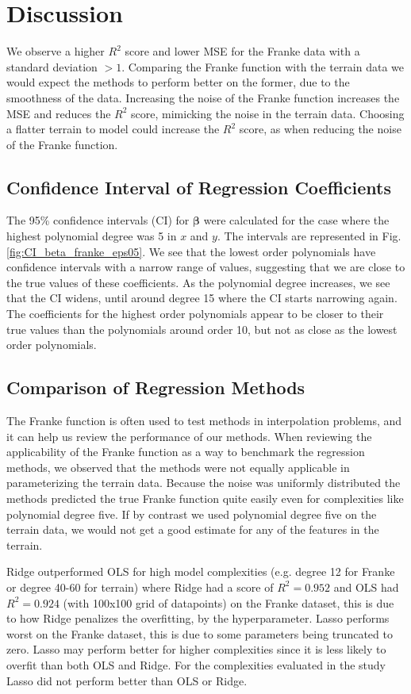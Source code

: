 \documentclass[%
 reprint,
nofootinbib,
 amsmath,amssymb,
 aps,
]{revtex4-2}
\begin{document}
\section{Discussion}\label{sec:discussion}
We observe a higher $R^2$ score and lower MSE for the Franke data with a standard deviation $> 1$. Comparing the Franke function with the terrain data we would expect the methods to perform better on the former, due to the smoothness of the data. Increasing the noise of the Franke function increases the MSE and reduces the $R^2$ score, mimicking the noise in the terrain data. Choosing a flatter terrain to model could increase the $R^2$ score, as when reducing the noise of the Franke function.

\subsection{Confidence Interval of Regression Coefficients}
The 95\% confidence intervals (CI) for $\boldsymbol{\beta}$ were calculated for the case where the highest polynomial degree was 5 in $x$ and $y$. The intervals are represented in Fig. \ref{fig:CI_beta_franke_eps05}. We see that the lowest order polynomials have confidence intervals with a narrow range of values, suggesting that we are close to the true values of these coefficients. As the polynomial degree increases, we see that the CI widens, until around degree 15 where the CI starts narrowing again. The coefficients for the highest order polynomials appear to be closer to their true values than the polynomials around order 10, but not as close as the lowest order polynomials.

\subsection{Comparison of Regression Methods}
The Franke function is often used to test methods in interpolation problems, and it can help us review the performance of our methods. When reviewing the applicability of the Franke function as a way to benchmark the regression methods, we observed that the methods were not equally applicable in parameterizing the terrain data. Because the noise was uniformly distributed the methods predicted the true Franke function quite easily even for complexities like polynomial degree five. If by contrast we used polynomial degree five on the terrain data, we would not get a good estimate for any of the features in the terrain.

Ridge outperformed OLS for high model complexities (e.g. degree 12 for Franke or degree 40-60 for terrain) where Ridge had a score of $R^2 = 0.952$ and OLS had $R^2 = 0.924$ (with 100x100 grid of datapoints) on the Franke dataset, this is due to how Ridge penalizes the overfitting, by the hyperparameter. Lasso performs worst on the Franke dataset, this is due to some parameters being truncated to zero. Lasso may perform better for higher complexities since it is less likely to overfit than both OLS and Ridge. For the complexities evaluated in the study Lasso did not perform better than OLS or Ridge.
\end{document}
